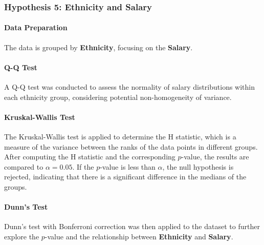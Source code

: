 \subsubsection{Hypothesis 5: Ethnicity and Salary}

\paragraph{Data Preparation}
The data is grouped by \textbf{Ethnicity}, focusing on the \textbf{Salary}.

\paragraph{Q-Q Test}
A Q-Q test was conducted to assess the normality of salary distributions within each ethnicity group, considering potential non-homogeneity of variance.

\paragraph{Kruskal-Wallis Test}
The Kruskal-Wallis test is applied to determine the H statistic, which is a measure of the variance between the ranks of the data points in different groups. After computing the H statistic and the corresponding $p$-value, the results are compared to $\alpha = 0.05$. If the $p$-value is less than $\alpha$, the null hypothesis is rejected, indicating that there is a significant difference in the medians of the groups.

\paragraph{Dunn's Test}
Dunn's test with Bonferroni correction was then applied to the dataset to further explore the $p$-value and the relationship between \textbf{Ethnicity} and \textbf{Salary}.
